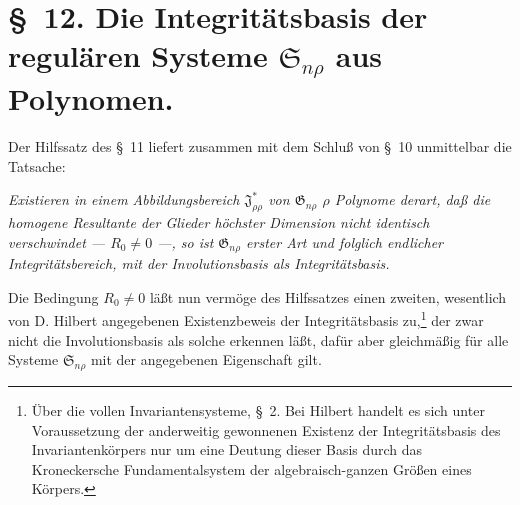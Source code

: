 \documentclass[11pt]{article}
\providecommand{\Ssys}{\mathfrak{S}}
\providecommand{\Jdom}{\mathfrak{J}}
\providecommand{\Gdom}{\mathfrak{G}}
\begin{document}
\section*{\S\ 12. Die Integritätsbasis der regulären Systeme $\Ssys_{n\rho}$ aus Polynomen.}

Der Hilfssatz des \S\ 11 liefert zusammen mit dem Schluß von \S\ 10 unmittelbar die Tatsache:

\emph{Existieren in einem Abbildungsbereich $\Jdom^*_{\rho\rho}$ von $\Gdom_{n\rho}$ $\rho$ Polynome derart, daß die homogene Resultante der Glieder höchster Dimension nicht identisch verschwindet --- $R_0\ne0$ ---, so ist $\Gdom_{n\rho}$ erster Art und folglich endlicher Integritätsbereich, mit der Involutionsbasis als Integritätsbasis.}

Die Bedingung $R_0\ne0$ läßt nun vermöge des Hilfssatzes einen zweiten, wesentlich von D. Hilbert angegebenen Existenzbeweis der Integritätsbasis zu,\footnote{Über die vollen Invariantensysteme, \S\ 2. Bei Hilbert handelt es sich unter Voraussetzung der anderweitig gewonnenen Existenz der Integritätsbasis des Invariantenkörpers nur um eine Deutung dieser Basis durch das Kroneckersche Fundamentalsystem der algebraisch-ganzen Größen eines Körpers.} der zwar nicht die Involutionsbasis als solche erkennen läßt, dafür aber gleichmäßig für alle Systeme $\Ssys_{n\rho}$ mit der angegebenen Eigenschaft gilt.
\end{document}

